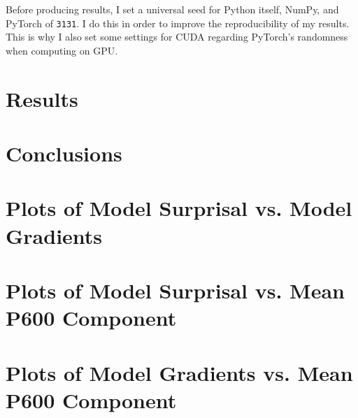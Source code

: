 \documentclass{IEEEtran}
\begin{document}
Before producing results, I set a universal seed for Python itself, NumPy, and PyTorch of \texttt{3131}.
I do this in order to improve the reproducibility of my results.
This is why I also set some settings for CUDA regarding PyTorch's randomness when computing on GPU.

\section{Results}


\section{Conclusions}




\onecolumn
\appendix
\section{Plots of Model Surprisal vs. Model Gradients}

\section{Plots of Model Surprisal vs. Mean P600 Component}

\section{Plots of Model Gradients vs. Mean P600 Component}
\end{document}
